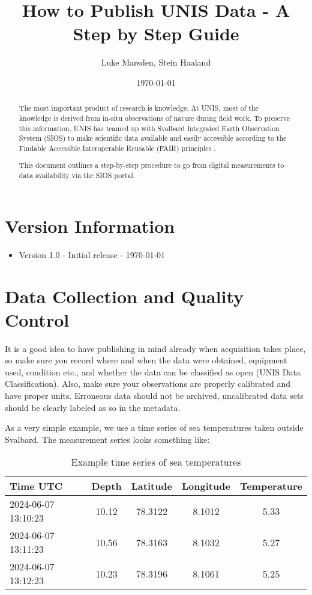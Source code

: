 \documentclass[a4paper,12pt]{article}
\title{How to Publish UNIS Data - A Step by Step Guide}
\author{
    Luke Marsden, Stein Haaland \\
    \emailauthors
}
\date{\today}
\begin{document}
\maketitle

\begin{abstract}
The most important product of research is knowledge. At UNIS, most of the knowledge is derived from in-situ observations of nature during field work. To preserve this information, UNIS has teamed up with Svalbard Integrated Earth Observation System (SIOS) to make scientific data available and easily accessible according to the Findable Accessible Interoperable Reusable (FAIR) principles \citep{wilkinson2016fair}.

This document outlines a step-by-step procedure to go from digital measurements to data availability via the SIOS portal.
\end{abstract}

\tableofcontents

\section*{Version Information}
\label{sec:version-info}
\begin{itemize}
    \item Version 1.0 - Initial release - \today
\end{itemize}

\newpage

\section{Data Collection and Quality Control}
\label{sec:data-collection-quality-control}

It is a good idea to have publishing in mind already when acquisition takes place, so make sure you record where and when the data were obtained, equipment used, condition etc., and whether the data can be classified as open (UNIS Data Classification). Also, make sure your observations are properly calibrated and have proper units. Erroneous data should not be archived, uncalibrated data sets should be clearly labeled as so in the metadata. 

As a very simple example, we use a time series of sea temperatures taken outside Svalbard. The measurement series looks something like:

\begin{table}[h!]
\centering
\caption{Example time series of sea temperatures}
\label{table:sea-temperatures}
\begin{tabular}{lcccc}
\hline
\textbf{Time UTC} & \textbf{Depth} & \textbf{Latitude} & \textbf{Longitude} & \textbf{Temperature} \\
\hline
2024-06-07 13:10:23 & 10.12 & 78.3122 & 8.1012 & 5.33 \\
2024-06-07 13:11:23 & 10.56 & 78.3163 & 8.1032 & 5.27 \\
2024-06-07 13:12:23 & 10.23 & 78.3196 & 8.1061 & 5.25 \\
\hline
\end{tabular}
\end{table}
\end{document}
